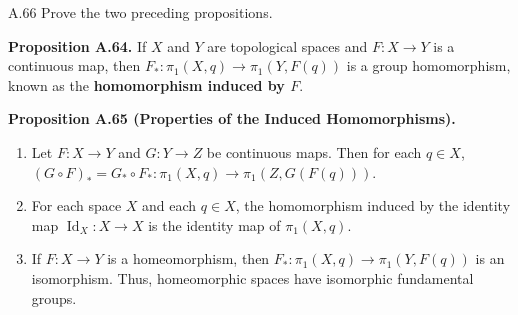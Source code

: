 \begin{exercise}{A.66}
    Prove the two preceding propositions.

    \textbf{Proposition A.64.} If \( X \) and \( Y \) are topological spaces and \( F: X \to Y \) is a continuous map, then \( F_{\ast}: \pi_{1}(X, q) \to \pi_{1}(Y, F(q)) \) is a group homomorphism, known as the \textbf{homomorphism induced by \(F\)}.

    \textbf{Proposition A.65 (Properties of the Induced Homomorphisms).}

    \begin{enumerate}[itemsep=0pt,label={(\alph*)}]
        \item Let \( F: X \to Y \) and \( G: Y \to Z \) be continuous maps. Then for each \( q \in X \), \( {(G \circ F)}_{\ast} = G_{\ast} \circ F_{\ast}: \pi_{1}(X, q) \to \pi_{1}(Z, G(F(q))) \).
        \item For each space \( X \) and each \( q \in X \), the homomorphism induced by the identity map \( \operatorname{Id}_{X}: X \to X \) is the identity map of \( \pi_{1}(X, q) \).
        \item If \( F: X \to Y \) is a homeomorphism, then \( F_{\ast}: \pi_{1}(X, q) \to \pi_{1}(Y, F(q)) \) is an isomorphism. Thus, homeomorphic spaces have isomorphic fundamental groups.
    \end{enumerate}
\end{exercise}


